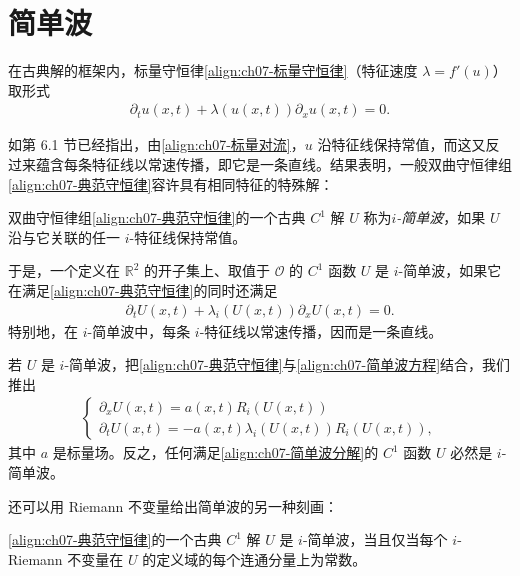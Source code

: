 \documentclass[../../main.tex]{subfiles}
\begin{document}
\section{简单波}\label{section:ch07-简单波}

在古典解的框架内，标量守恒律\eqref{align:ch07-标量守恒律}（特征速度 $\lambda=f'(u)$）取形式
\begin{align}
\partial_t u(x,t)+\lambda(u(x,t))\partial_x u(x,t)=0.
\label{align:ch07-标量对流}
\end{align}

如第 6.1 节已经指出，由\eqref{align:ch07-标量对流}，$u$ 沿特征线保持常值，而这又反过来蕴含每条特征线以常速传播，即它是一条直线。结果表明，一般双曲守恒律组\eqref{align:ch07-典范守恒律}容许具有相同特征的特殊解：

\begin{definition}[$i$-简单波]\label{definition:ch07-i简单波}
双曲守恒律组\eqref{align:ch07-典范守恒律}的一个古典 $C^1$ 解 $U$ 称为\emph{$i$-简单波}，如果 $U$ 沿与它关联的任一 $i$-特征线保持常值。
\end{definition}

于是，一个定义在 $\mathbb{R}^2$ 的开子集上、取值于 $\mathscr{O}$ 的 $C^1$ 函数 $U$ 是 $i$-简单波，如果它在满足\eqref{align:ch07-典范守恒律}的同时还满足
\begin{align}
\partial_t U(x,t)+\lambda_i(U(x,t))\partial_x U(x,t)=0.
\label{align:ch07-简单波方程}
\end{align}
特别地，在 $i$-简单波中，每条 $i$-特征线以常速传播，因而是一条直线。

若 $U$ 是 $i$-简单波，把\eqref{align:ch07-典范守恒律}与\eqref{align:ch07-简单波方程}结合，我们推出
\begin{align}
\begin{cases}
\partial_x U(x,t)=a(x,t)R_i(U(x,t))\\
\partial_t U(x,t)=-a(x,t)\lambda_i(U(x,t))R_i(U(x,t)),
\end{cases}
\label{align:ch07-简单波分解}
\end{align}
其中 $a$ 是标量场。反之，任何满足\eqref{align:ch07-简单波分解}的 $C^1$ 函数 $U$ 必然是 $i$-简单波。

还可以用 Riemann 不变量给出简单波的另一种刻画：

\begin{theorem}\label{theorem:ch07-简单波Riemann判据}
\eqref{align:ch07-典范守恒律}的一个古典 $C^1$ 解 $U$ 是 $i$-简单波，当且仅当每个 $i$-Riemann 不变量在 $U$ 的定义域的每个连通分量上为常数。
\end{theorem}
\end{document}
